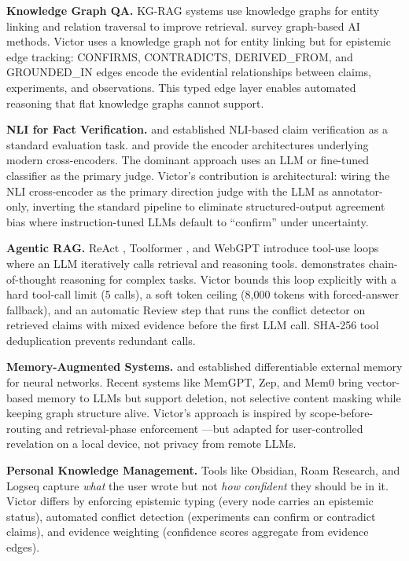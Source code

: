 \documentclass[letterpaper]{article}          %
\theoremstyle{plain}
\theoremstyle{definition}
\theoremstyle{remark}
\begin{document}
\textbf{Knowledge Graph QA.} KG-RAG systems \citep{pan2024kgrag} use knowledge
graphs for entity linking and relation traversal to improve retrieval.
\citet{ji2022graph} survey graph-based AI methods. Victor uses a knowledge graph
not for entity linking but for epistemic edge tracking: CONFIRMS, CONTRADICTS,
DERIVED\_FROM, and GROUNDED\_IN edges encode the evidential relationships between
claims, experiments, and observations. This typed edge layer enables automated
reasoning that flat knowledge graphs cannot support.

\textbf{NLI for Fact Verification.} \citet{thorne2018fever} and
\citet{wadden2020scifact} established NLI-based claim verification as a standard
evaluation task. \citet{devlin2019bert} and \citet{he2021deberta} provide the
encoder architectures underlying modern cross-encoders. The dominant approach
uses an LLM or fine-tuned classifier as the primary judge. Victor's contribution
is architectural: wiring the NLI cross-encoder as the primary direction judge
with the LLM as annotator-only, inverting the standard pipeline to eliminate
structured-output agreement bias where instruction-tuned LLMs default to
``confirm'' under uncertainty.

\textbf{Agentic RAG.} ReAct \citep{yao2023react}, Toolformer
\citep{schick2023toolformer}, and WebGPT \citep{nakano2021webgpt} introduce
tool-use loops where an LLM iteratively calls retrieval and reasoning tools.
\citet{wei2022cot} demonstrates chain-of-thought reasoning for complex tasks.
Victor bounds this loop explicitly with a hard tool-call limit (5 calls), a soft
token ceiling (8,000 tokens with forced-answer fallback), and an automatic Review
step that runs the conflict detector on retrieved claims with mixed evidence
before the first LLM call. SHA-256 tool deduplication prevents redundant calls.

\textbf{Memory-Augmented Systems.} \citet{graves2016hybrid} and
\citet{sukhbaatar2015memory} established differentiable external memory for
neural networks. Recent systems like MemGPT, Zep, and Mem0 bring vector-based
memory to LLMs but support deletion, not selective content masking while keeping
graph structure alive. Victor's approach is inspired by scope-before-routing
\citep{shardmemo2025} and retrieval-phase enforcement \citep{sdrag2025}---but
adapted for user-controlled revelation on a local device, not privacy from remote
LLMs.

\textbf{Personal Knowledge Management.} Tools like Obsidian, Roam Research, and
Logseq capture \emph{what} the user wrote but not \emph{how confident} they
should be in it. Victor differs by enforcing epistemic typing (every node carries
an epistemic status), automated conflict detection (experiments can confirm or
contradict claims), and evidence weighting (confidence scores aggregate from
evidence edges).
\end{document}
